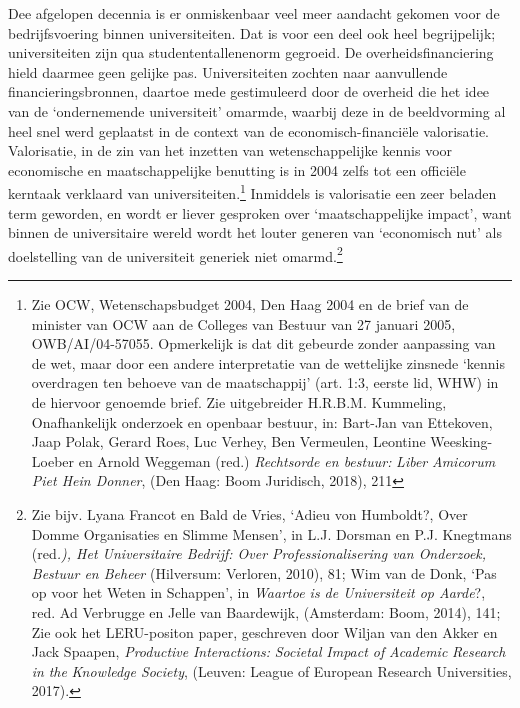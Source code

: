 \documentclass[smallauthor, chapterhaspagenum, nochapterinheader, pagenuminheader,  bigchapnum,medium2, tocpages,  garamond, titleinheader]{jote-book}
\begin{document}
	Dee afgelopen decennia is er onmiskenbaar veel meer aandacht gekomen voor de bedrijfsvoering binnen universiteiten. Dat is voor een deel ook heel begrijpelijk; universiteiten zijn qua studententallenenorm gegroeid. De overheidsfinanciering hield daarmee geen gelijke pas. Universiteiten zochten naar aanvullende financieringsbronnen, daartoe mede gestimuleerd door de overheid die het idee van de ‘ondernemende universiteit' omarmde, waarbij deze in de beeldvorming al heel snel werd geplaatst in de context van de economisch-financiële valorisatie. Valorisatie, in de zin van het inzetten van wetenschappelijke kennis voor economische en maatschappelijke benutting is in 2004 zelfs tot een officiële kerntaak verklaard van universiteiten.\footnote{Zie OCW, Wetenschapsbudget 2004, Den Haag 2004 en de brief van de minister van OCW aan de Colleges van Bestuur van 27 januari 2005, OWB/AI/04-57055. Opmerkelijk is dat dit gebeurde zonder aanpassing van de wet, maar door een andere interpretatie van de wettelijke zinsnede ‘kennis overdragen ten behoeve van de maatschappij' (art. 1:3, eerste lid, WHW) in de hiervoor genoemde brief. Zie uitgebreider H.R.B.M. Kummeling, Onafhankelijk onderzoek en openbaar bestuur, in: Bart-Jan van Ettekoven, Jaap Polak, Gerard Roes, Luc Verhey, Ben Vermeulen, Leontine Weesking-Loeber en Arnold Weggeman (red.) \emph{Rechtsorde en bestuur:}\emph{ }\emph{Liber }\emph{Amicorum}\emph{ }\emph{Piet Hein Donner}, (Den Haag: Boom Juridisch, 2018), 211 } Inmiddels is valorisatie een zeer beladen term geworden, en wordt er liever gesproken over ‘maatschappelijke impact', want binnen de universitaire wereld wordt het louter generen van ‘economisch nut' als doelstelling van de universiteit generiek niet omarmd.\footnote{Zie bijv. Lyana Francot en Bald de Vries, ‘Adieu von Humboldt?, Over Domme Organisaties en Slimme Mensen', in L.J. Dorsman en P.J. Knegtmans (red\emph{.), Het Universitaire Bedrijf: Over Professionalisering van Onderzoek, Bestuur en Beheer} (Hilversum: Verloren, 2010), 81; Wim van de Donk, ‘Pas op voor het Weten in Schappen', in \emph{Waartoe is de Universiteit op Aarde}?, red. Ad Verbrugge en Jelle van Baardewijk, (Amsterdam: Boom, 2014), 141; Zie ook het LERU-positon paper, geschreven door Wiljan van den Akker en Jack Spaapen, \emph{Productive}\emph{ }\emph{Interactions}\emph{:}\emph{ }\emph{Societal}\emph{ Impact of }\emph{Academic}\emph{ Research in }\emph{the}\emph{ Knowledge Society}, (Leuven: League of European Research Universities, 2017).}
\end{document}
